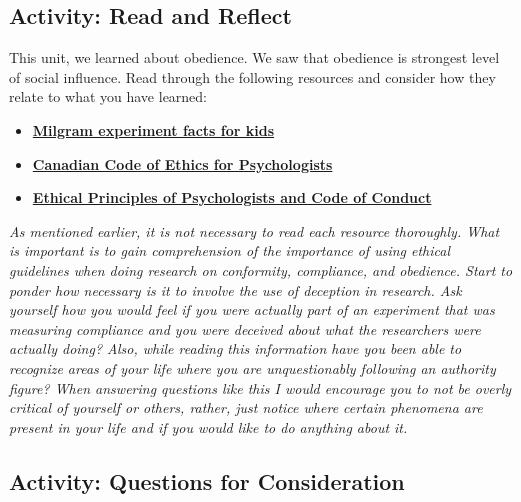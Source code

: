 \documentclass[
]{book}
\providecommand{\tightlist}{%
  \setlength{\itemsep}{0pt}\setlength{\parskip}{0pt}}
\begin{document}
\hypertarget{activity-read-and-reflect-8}{%
\subsection*{Activity: Read and Reflect}\label{activity-read-and-reflect-8}}

\begin{reflect}
This unit, we learned about obedience. We saw that obedience is strongest level of social influence. Read through the following resources and consider how they relate to what you have learned:

\begin{itemize}
\tightlist
\item
  \href{https://kids.kiddle.co/Milgram_experiment}{\textbf{Milgram experiment facts for kids}}
\item
  \href{https://cpa.ca/docs/File/Ethics/CPA_Code_2017_4thEd.pdf}{\textbf{Canadian Code of Ethics for Psychologists}}\\
\item
  \href{https://www.apa.org/ethics/code/index}{\textbf{Ethical Principles of Psychologists and Code of Conduct}}
\end{itemize}

\emph{As mentioned earlier, it is not necessary to read each resource thoroughly. What is important is to gain comprehension of the importance of using ethical guidelines when doing research on conformity, compliance, and obedience. Start to ponder how necessary is it to involve the use of deception in research. Ask yourself how you would feel if you were actually part of an experiment that was measuring compliance and you were deceived about what the researchers were actually doing? Also, while reading this information have you been able to recognize areas of your life where you are unquestionably following an authority figure? When answering questions like this I would encourage you to not be overly critical of yourself or others, rather, just notice where certain phenomena are present in your life and if you would like to do anything about it.}
\end{reflect}

\hypertarget{activity-questions-for-consideration-8}{%
\subsection*{Activity: Questions for Consideration}\label{activity-questions-for-consideration-8}}
\end{document}
